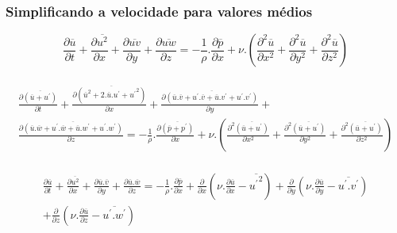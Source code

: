 \documentclass[xcolor=dvipsnames,10pt,aspectratio=169]{beamer}
\begin{document}
		
				\begin{frame}
		\frametitle{Simplificando a velocidade para valores médios}
		\begin{equation}
		\frac{\partial \overline{u}}{\partial t} + \frac{\partial \overline{u^2}}{\partial x} + \frac{\partial \overline{uv}}{\partial y} + \frac{\partial \overline{uw}}{\partial z} = - \frac{1}{\rho} . \frac{\partial \overline{p}}{\partial x} + \nu . \left( \frac{\partial^2 \overline{u}}{\partial {x^2}} + \frac{\partial^2 \overline{u}}{\partial y^2} + \frac{\partial^2 \overline{u}}{\partial z^2}   \right)
		\end{equation}
		\\
		\begin{equation}
		\begin{split}
		\frac{\partial \overline{(\overline{u} + u^\prime)}}{\partial t} + \frac{\partial \overline{(\overline{u}^2 + 2 . \overline{u} . u^\prime + {u^\prime}^2)}}{\partial x} + \frac{\partial \overline{(\overline{u}.\overline{v} + u^\prime . \overline{v} + \overline{u} . v^\prime + u^\prime . v ^\prime )}}{\partial y} + \\
		\frac{\partial \overline{(\overline{u}.\overline{w} + u^\prime . \overline{w} + \overline{u} . w^\prime + u^\prime . w ^\prime )}}{\partial z} = - \frac{1}{\rho} . \frac{\partial \overline{(\overline{p} + p ^\prime)}}{\partial x} + \nu . \left( \frac{\partial^2 \overline{(\overline{u} + u^\prime)}}{\partial {x^2}} + \frac{\partial^2 \overline{(\overline{u} + u^\prime)}}{\partial y^2} + \frac{\partial^2 \overline{(\overline{u} + u^\prime)}}{\partial z^2}   \right)
		\end{split}
		\end{equation}
		\\
		\begin{equation}
		\begin{split}
		\frac{\partial \overline{u}}{\partial t} + \frac{\partial \overline{u^2}}{\partial x} + \frac{\partial \overline{u}.\overline{v}}{\partial y} + \frac{\partial \overline{u}.\overline{w}}{\partial z} =  - \frac{1}{\rho} . \frac{\partial \overline{{p}}}{\partial x} + \frac{\partial}{\partial x} \left( \nu.\frac{\partial \overline{u}}{\partial x} - \overline{{u^\prime}^2}\right) + \frac{\partial}{\partial y} \left( \nu.\frac{\partial \overline{u}}{\partial y} - \overline{{u^\prime . v^\prime}}\right) \\
		+ \frac{\partial}{\partial z} \left( \nu . \frac{\partial \overline{u}}{\partial z} - \overline{ u ^\prime . w ^\prime} \right)
		\end{split}
		\end{equation}
		\end{frame}
		
\end{document}
